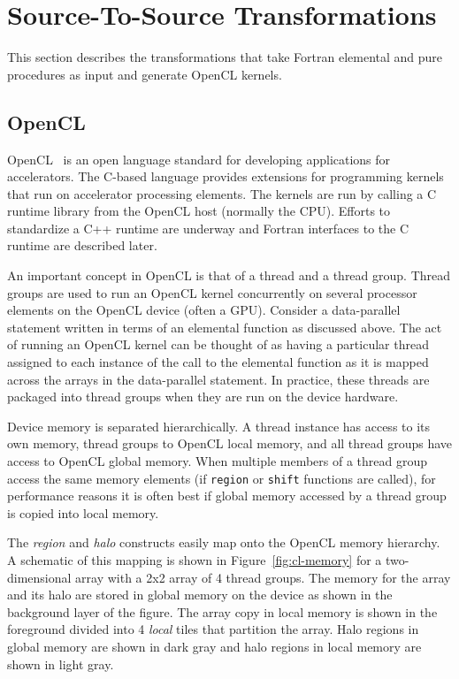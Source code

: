 \section{Source-To-Source Transformations}

This section describes the transformations that take Fortran elemental and
pure procedures as input and generate OpenCL kernels.

\subsection{OpenCL}

OpenCL~\cite{opencl08} is an open language standard for developing
applications for accelerators.  The C-based language provides extensions for
programming kernels that run on accelerator processing elements.  The kernels
are run by calling a C runtime library from the OpenCL host (normally the
CPU).  Efforts to standardize a C++ runtime are underway and Fortran
interfaces to the C runtime are described later.

An important concept in OpenCL is that of a thread and a thread group.  Thread
groups are used to run an OpenCL kernel concurrently on several processor
elements on the OpenCL device (often a GPU).  Consider a data-parallel
statement written in terms of an elemental function as discussed above.  The
act of running an OpenCL kernel can be thought of as having a particular
thread assigned to each instance of the call to the elemental function as it
is mapped across the arrays in the data-parallel statement.  In practice,
these threads are packaged into thread groups when they are run on the device
hardware.

Device memory is separated hierarchically.  A thread instance has access to
its own memory, thread groups to OpenCL local memory, and all thread groups
have access to OpenCL global memory.  When multiple members of a thread group
access the same memory elements (if {\tt region} or {\tt shift}
functions are called), for performance reasons it is often best if global
memory accessed by a thread group is copied into local memory.

The \emph{region} and \emph{halo} constructs easily map onto the OpenCL memory
hierarchy.  A schematic of this mapping is shown in Figure~\ref{fig:cl-memory}
for a two-dimensional array with a 2x2 array of 4 thread groups.  The memory
for the array and its halo are stored in global memory on the device as shown
in the background layer of the figure.  The array copy in local memory is
shown in the foreground divided into 4 \emph{local} tiles that partition the
array.  Halo regions in global memory are shown in dark gray and halo regions
in local memory are shown in light gray.

